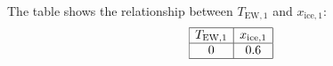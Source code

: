 The table shows the relationship between \( T_{\text{EW},1} \) and \( x_{\text{ice},1} \):  
\[
\begin{array}{|c|c|}
\hline
T_{\text{EW},1} & x_{\text{ice},1} \\
\hline
0 & 0.6 \\
\hline
\end{array}
\]